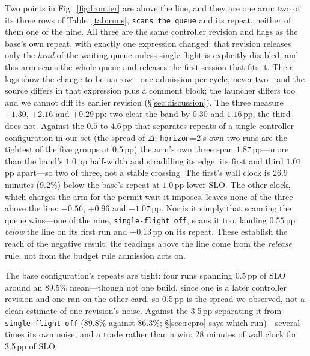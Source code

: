 Two points in Fig.~\ref{fig:frontier} are above the line, and they are one arm:
two of its three rows of Table~\ref{tab:runs}, \texttt{scans the queue} and its
repeat, neither of them one of the nine. All three are the same controller
revision and flags as the base's own repeat, with exactly one expression changed:
that revision releases only the \emph{head} of the waiting queue unless single-flight is
explicitly disabled, and this arm scans the whole queue and releases the first
session that fits it. Their logs show
the change to be narrow---one admission per cycle, never two---and the source
differs in that expression plus a comment block; the launcher differs too and we
cannot diff its earlier revision (\S\ref{sec:discussion}).
The three measure $+1.30$, $+2.16$ and $+0.29$\,pp: two clear the band by $0.30$
and $1.16$\,pp, the third does not. Against the $0.5$ to $4.6$\,pp that
separates repeats of a single controller configuration in our set (the spread of
$\Delta$; \texttt{horizon}=2's own two runs are the tightest of the five groups at
$0.5$\,pp) the arm's own three span $1.87$\,pp---more than the band's $1.0$\,pp
half-width and straddling its edge, its first and third $1.01$\,pp apart---so two of
three, not a stable crossing.
The first's wall clock is $26.9$ minutes ($9.2\%$) below the base's repeat at
$1.0$\,pp lower SLO. The other clock, which charges the arm for the permit wait it
imposes, leaves none of the three above the line: $-0.56$, $+0.96$ and
$-1.07$\,pp. Nor is it simply that scanning the queue
wins---one of the nine, \texttt{single-flight off}, scans it too, landing
$0.55$\,pp \emph{below} the line on its first run and $+0.13$\,pp on its repeat.
These establish the reach of the negative result: the readings above the line
come from the \emph{release} rule, not from the budget rule admission acts on.

The base configuration's repeats are tight: four runs spanning 0.5\,pp of SLO
around an 89.5\% mean---though not one build, since one is a later controller
revision and one ran on the other card, so 0.5\,pp is the spread we observed, not
a clean estimate of one revision's noise. Against the 3.5\,pp separating it from \texttt{single-flight
off} (89.8\% against 86.3\%; \S\ref{sec:repro} says which run)---several times its
own noise, and a trade rather than a win: 28 minutes of wall clock for 3.5\,pp of
SLO.

